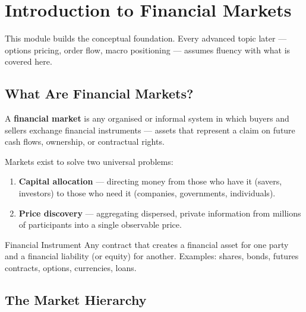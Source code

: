 
\chapter{Introduction to Financial Markets}

\begin{notebox}
This module builds the conceptual foundation. Every advanced topic later — options pricing,
order flow, macro positioning — assumes fluency with what is covered here.
\end{notebox}

\section{What Are Financial Markets?}

A \textbf{financial market} is any organised or informal system in which buyers and sellers
exchange financial instruments — assets that represent a claim on future cash flows, ownership,
or contractual rights.

Markets exist to solve two universal problems:
\begin{enumerate}[label=\textbf{\arabic*.}]
  \item \textbf{Capital allocation} — directing money from those who have it (savers, investors)
        to those who need it (companies, governments, individuals).
  \item \textbf{Price discovery} — aggregating dispersed, private information from millions of
        participants into a single observable price.
\end{enumerate}

\begin{keyterm}{Financial Instrument}
Any contract that creates a financial asset for one party and a financial liability (or equity)
for another. Examples: shares, bonds, futures contracts, options, currencies, loans.
\end{keyterm}

\section{The Market Hierarchy}

